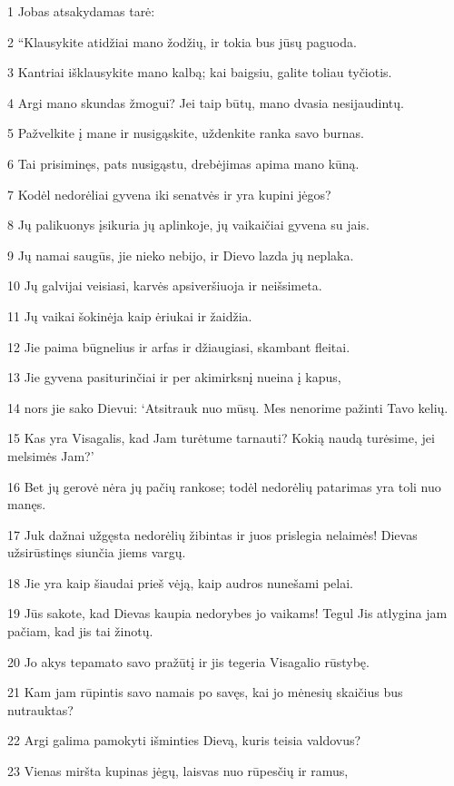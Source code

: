 \par 1 Jobas atsakydamas tarė: 
\par 2 “Klausykite atidžiai mano žodžių, ir tokia bus jūsų paguoda. 
\par 3 Kantriai išklausykite mano kalbą; kai baigsiu, galite toliau tyčiotis. 
\par 4 Argi mano skundas žmogui? Jei taip būtų, mano dvasia nesijaudintų. 
\par 5 Pažvelkite į mane ir nusigąskite, uždenkite ranka savo burnas. 
\par 6 Tai prisiminęs, pats nusigąstu, drebėjimas apima mano kūną. 
\par 7 Kodėl nedorėliai gyvena iki senatvės ir yra kupini jėgos? 
\par 8 Jų palikuonys įsikuria jų aplinkoje, jų vaikaičiai gyvena su jais. 
\par 9 Jų namai saugūs, jie nieko nebijo, ir Dievo lazda jų neplaka. 
\par 10 Jų galvijai veisiasi, karvės apsiveršiuoja ir neišsimeta. 
\par 11 Jų vaikai šokinėja kaip ėriukai ir žaidžia. 
\par 12 Jie paima būgnelius ir arfas ir džiaugiasi, skambant fleitai. 
\par 13 Jie gyvena pasiturinčiai ir per akimirksnį nueina į kapus, 
\par 14 nors jie sako Dievui: ‘Atsitrauk nuo mūsų. Mes nenorime pažinti Tavo kelių. 
\par 15 Kas yra Visagalis, kad Jam turėtume tarnauti? Kokią naudą turėsime, jei melsimės Jam?’ 
\par 16 Bet jų gerovė nėra jų pačių rankose; todėl nedorėlių patarimas yra toli nuo manęs. 
\par 17 Juk dažnai užgęsta nedorėlių žibintas ir juos prislegia nelaimės! Dievas užsirūstinęs siunčia jiems vargų. 
\par 18 Jie yra kaip šiaudai prieš vėją, kaip audros nunešami pelai. 
\par 19 Jūs sakote, kad Dievas kaupia nedorybes jo vaikams! Tegul Jis atlygina jam pačiam, kad jis tai žinotų. 
\par 20 Jo akys tepamato savo pražūtį ir jis tegeria Visagalio rūstybę. 
\par 21 Kam jam rūpintis savo namais po savęs, kai jo mėnesių skaičius bus nutrauktas? 
\par 22 Argi galima pamokyti išminties Dievą, kuris teisia valdovus? 
\par 23 Vienas miršta kupinas jėgų, laisvas nuo rūpesčių ir ramus, 
